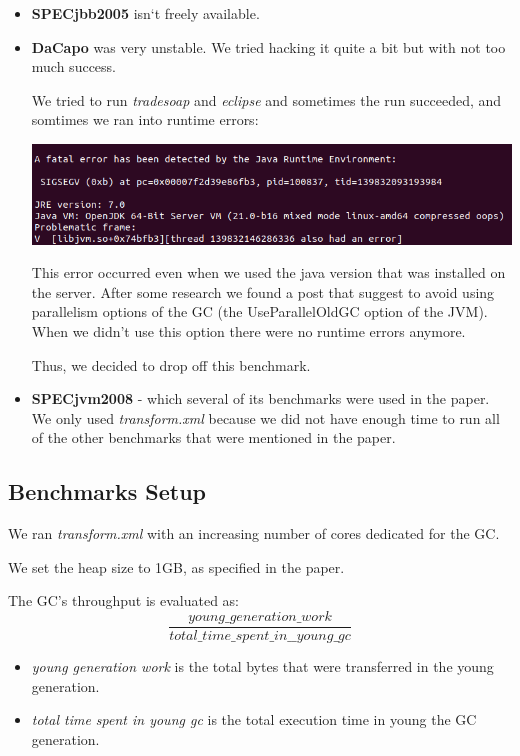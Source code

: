 \documentclass{article}
\begin{document}
 \begin{itemize}
   \item \textbf{SPECjbb2005} isn`t freely available.
   \item \textbf{DaCapo} was very unstable. We tried hacking it quite a bit but with not too much success.

	   We tried to run \textit{tradesoap} and \textit{eclipse} and sometimes the run succeeded, and somtimes we ran into runtime errors:

 \includegraphics[width=\textwidth]{dacapo_error.png}

         This error occurred even when we used the java version that was installed on the server.
         After some research we found a post that suggest to avoid using parallelism options of the GC (the UseParallelOldGC option of the JVM). When we didn't use this option there were no runtime errors anymore.

         Thus, we decided to drop off this benchmark.
   \item \textbf{SPECjvm2008} - which several of its benchmarks were used in the paper. We only used \textit{transform.xml} because we did not have enough time to run all of the other benchmarks that were mentioned in the paper.
 \end{itemize}

 \subsection{Benchmarks Setup}
 We ran \textit{transform.xml} with an increasing number of cores dedicated for the GC.

 We set the heap size to 1GB, as specified in the paper.

 The GC's throughput is evaluated as:
 \begin{equation}
	 \frac{young\_generation\_work}{total\_time\_spent\_in\_\_young\_gc}
 \end{equation}

 \begin{itemize}
   \item \textit{young generation work} is the total bytes that were transferred in the young generation.
   \item \textit{total time spent in young gc} is the total execution time in young the GC generation.
 \end{itemize}
\end{document}
